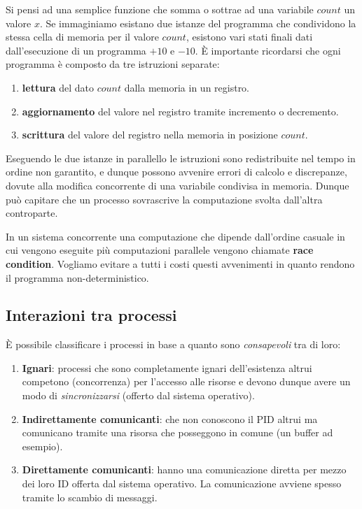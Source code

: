 \documentclass{article}
\begin{document}
Si pensi ad una semplice funzione che somma o sottrae ad una variabile $count$ un valore $x$.
Se immaginiamo esistano due istanze del programma che condividono la stessa cella di memoria
per il valore $count$, esistono vari stati finali dati dall'esecuzione di un programma $+10$
e $-10$. \`E importante ricordarsi che ogni programma \`e composto da tre istruzioni separate:
\begin{enumerate}
  \item \textbf{lettura} del dato $count$ dalla memoria in un registro.
  \item \textbf{aggiornamento} del valore nel registro tramite incremento o decremento.
  \item \textbf{scrittura} del valore del registro nella memoria in posizione $count$.
\end{enumerate}
Eseguendo le due istanze in parallello le istruzioni sono redistribuite nel tempo in ordine
non garantito, e dunque possono avvenire errori di calcolo e discrepanze, dovute alla modifica
concorrente di una variabile condivisa in memoria. Dunque pu\`o capitare che un processo
sovrascrive la computazione svolta dall'altra controparte.

In un sistema concorrente una computazione che dipende dall'ordine casuale in
cui vengono eseguite pi\`u computazioni parallele vengono chiamate \textbf{race
condition}. Vogliamo evitare a tutti i costi questi avvenimenti in quanto
rendono il programma non-deterministico.

\subsection{Interazioni tra processi}

\`E possibile classificare i processi in base a quanto sono \emph{consapevoli}
tra di loro:
\begin{enumerate}
  \item \textbf{Ignari}: processi che sono completamente ignari dell'esistenza
    altrui competono (concorrenza) per l'accesso alle risorse e devono dunque
    avere un modo di \emph{sincronizzarsi} (offerto dal sistema operativo).
  \item \textbf{Indirettamente comunicanti}: che non conoscono il PID altrui
    ma comunicano tramite una risorsa che posseggono in comune (un buffer ad
    esempio).
  \item \textbf{Direttamente comunicanti}: hanno una comunicazione diretta
    per mezzo dei loro ID offerta dal sistema operativo. La comunicazione
    avviene spesso tramite lo scambio di messaggi.
\end{enumerate}
\end{document}
